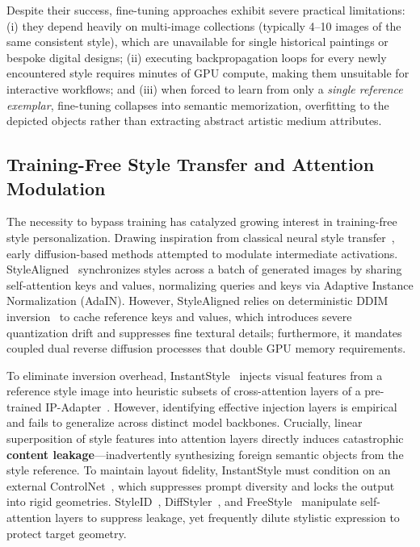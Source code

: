 Despite their success, fine-tuning approaches exhibit severe practical limitations: (i) they depend heavily on multi-image collections (typically 4--10 images of the same consistent style), which are unavailable for single historical paintings or bespoke digital designs; (ii) executing backpropagation loops for every newly encountered style requires minutes of GPU compute, making them unsuitable for interactive workflows; and (iii) when forced to learn from only a \textit{single reference exemplar}, fine-tuning collapses into semantic memorization, overfitting to the depicted objects rather than extracting abstract artistic medium attributes.

\subsection{Training-Free Style Transfer and Attention Modulation}
The necessity to bypass training has catalyzed growing interest in training-free style personalization. Drawing inspiration from classical neural style transfer~\cite{Gatys_2016_CVPR,AdaIn}, early diffusion-based methods attempted to modulate intermediate activations. StyleAligned~\cite{stylealigned} synchronizes styles across a batch of generated images by sharing self-attention keys and values, normalizing queries and keys via Adaptive Instance Normalization (AdaIN). However, StyleAligned relies on deterministic DDIM inversion~\cite{DDIM} to cache reference keys and values, which introduces severe quantization drift and suppresses fine textural details; furthermore, it mandates coupled dual reverse diffusion processes that double GPU memory requirements. 

To eliminate inversion overhead, InstantStyle~\cite{instantstyle} injects visual features from a reference style image into heuristic subsets of cross-attention layers of a pre-trained IP-Adapter~\cite{ipadapter}. However, identifying effective injection layers is empirical and fails to generalize across distinct model backbones. Crucially, linear superposition of style features into attention layers directly induces catastrophic \textbf{content leakage}---inadvertently synthesizing foreign semantic objects from the style reference. To maintain layout fidelity, InstantStyle must condition on an external ControlNet~\cite{controlNet}, which suppresses prompt diversity and locks the output into rigid geometries. StyleID~\cite{styleid}, DiffStyler~\cite{diffstyler}, and FreeStyle~\cite{freestyle} manipulate self-attention layers to suppress leakage, yet frequently dilute stylistic expression to protect target geometry. 

